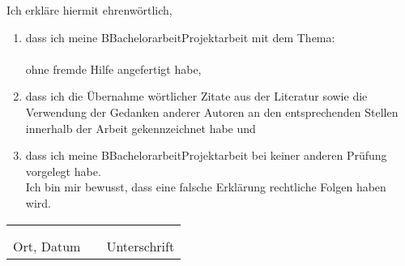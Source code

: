 Ich erkläre hiermit ehrenwörtlich,
\begin{flushleft}
\begin{enumerate}[leftmargin=0.5cm]
	\item 	dass ich meine {\if\CARBEIT BBachelorarbeit\else Projektarbeit\fi} 
	mit dem Thema:  \\
	\vspace*{1cm}
			\textbf{\CTITLE} \\
	\vspace*{1cm}
			ohne fremde Hilfe angefertigt habe, \\
	\item	dass ich die Übernahme wörtlicher Zitate aus der Literatur sowie die Verwendung der
			Gedanken anderer Autoren an den entsprechenden Stellen innerhalb der Arbeit gekennzeichnet habe und  \\
	\item	dass ich meine {\if\CARBEIT BBachelorarbeit\else Projektarbeit\fi} 
	bei keiner anderen Prüfung vorgelegt habe. \\
	\vspace*{1cm}
			Ich bin mir bewusst, dass eine falsche Erklärung rechtliche Folgen haben wird. \\
\end{enumerate}
\end{flushleft}
\vspace*{\fill}
\begin{tabular} {lrl}
	\hspace{5.5cm} & \hspace{3cm} & \hspace{5.5cm} \\
	\hrulefill & & \hrulefill \\
	Ort, Datum & & Unterschrift
\end{tabular}
\vspace*{\fill}

\cleardoublepage
